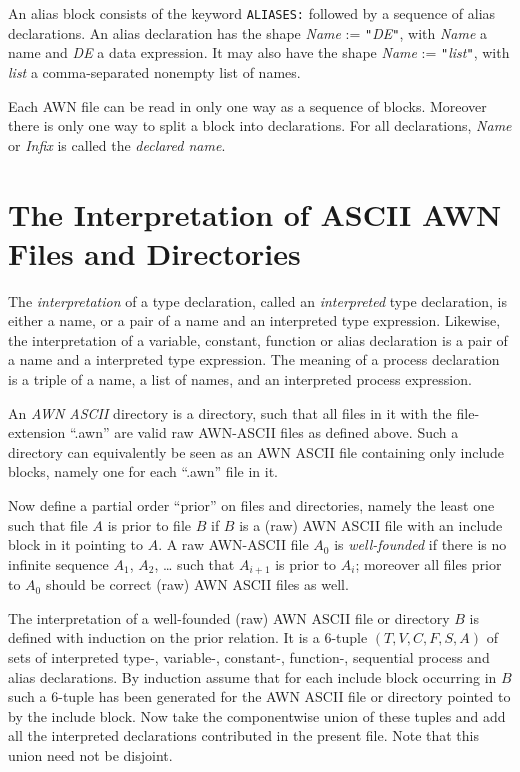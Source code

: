 \documentclass[adraft]{eptcs}
\begin{document}
An alias block consists of the keyword {\tt ALIASES:} followed by a sequence of alias declarations.
An alias declaration has the shape \textit{Name} := {\tt "}\textit{DE}{\tt "}, with \textit{Name} a
name and \textit{DE} a data expression.
It may also have the shape \textit{Name} := {\tt "}\textit{list}{\tt "}, with \textit{list} a
comma-separated nonempty list of names.

Each AWN file can be read in only one way as a sequence of blocks.
Moreover there is only one way to split a block into declarations.
For all declarations, \textit{Name} or \textit{Infix} is called the \emph{declared name}.

\section{The Interpretation of ASCII AWN Files and Directories}

The \emph{interpretation} of a type declaration, called an \emph{interpreted} type declaration,
is either a name, or a pair of a name and an interpreted type expression.
Likewise, the interpretation of a variable, constant, function or alias declaration is a pair of a name and a
interpreted type expression. The meaning of a process declaration is a triple of a name, a list of
names, and an interpreted process expression.

An \emph{AWN ASCII} directory is a directory, such that all files in it with the file-extension
``.awn'' are valid raw AWN-ASCII files as defined above. Such a directory can equivalently be seen as
an AWN ASCII file containing only include blocks, namely one for each ``.awn'' file in it.

Now define a partial order ``prior'' on files and directories, namely the least one such
that file $A$ is prior to file $B$ if $B$ is a (raw) AWN ASCII file with an include block in it pointing to $A$.
A raw AWN-ASCII file $A_0$ is \emph{well-founded} if there is no infinite sequence $A_1$, $A_2$, \dots
such that $A_{i+1}$ is prior to $A_i$; moreover all files prior to $A_0$ should be correct (raw) AWN
ASCII files as well.

The interpretation of a well-founded (raw) AWN ASCII file or directory $B$ is defined with induction on
the prior relation.  It is a 6-tuple $(T,V,C,F,S,A)$ of sets of interpreted type-, variable-,
constant-, function-, sequential process and alias declarations. By induction assume that for
each include block occurring in $B$ such a 6-tuple has been generated for the AWN ASCII file or
directory pointed to by the include block. Now take the componentwise union of these tuples and add
all the interpreted declarations contributed in the present file.  Note that this union need not be
disjoint.
\end{document}

